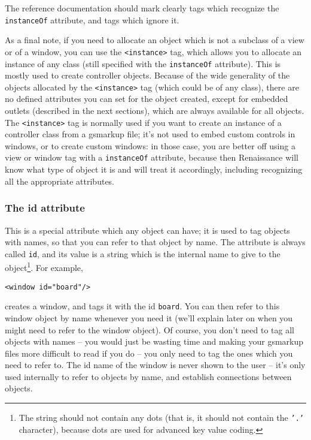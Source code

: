 The reference documentation should mark clearly tags which recognize
the \texttt{instanceOf} attribute, and tags which ignore it.

As a final note, if you need to allocate an object which is not a
subclass of a view or of a window, you can use the \texttt{<instance>}
tag, which allows you to allocate an instance of any class (still
specified with the \texttt{instanceOf} attribute).  This is mostly used to
create controller objects.  Because of the wide generality of the
objects allocated by the \texttt{<instance>} tag (which could be of
any class), there are no defined attributes you can set for the object
created, except for embedded outlets (described in the next sections),
which are always available for all objects.  The \texttt{<instance>}
tag is normally used if you want to create an instance of a controller
class from a gsmarkup file; it's not used to embed custom controls in
windows, or to create custom windows: in those case, you are better
off using a view or window tag with a \texttt{instanceOf} attribute,
because then Renaissance will know what type of object it is and will
treat it accordingly, including recognizing all the appropriate
attributes.

\subsubsection{The id attribute}
This is a special attribute which any object can have; it is used to
tag objects with names, so that you can refer to that object by name.
The attribute is always called \texttt{id}, and its value is a string
which is the internal name to give to the object\footnote{The string
should not contain any dots (that is, it should not contain the
\texttt{'.'} character), because dots are used for advanced key value
coding.}.  For example,
\begin{verbatim}
<window id="board"/>
\end{verbatim}
creates a window, and tags it with the id \texttt{board}.  You can
then refer to this window object by name whenever you need it (we'll
explain later on when you might need to refer to the window object).
Of course, you don't need to tag all objects with names -- you would
just be wasting time and making your gsmarkup files more difficult to
read if you do -- you only need to tag the ones which you need to
refer to.  The id name of the window is never shown to the user --
it's only used internally to refer to objects by name, and establish
connections between objects.

